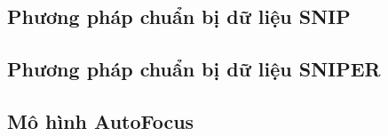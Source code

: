 {    \subsection{Phương pháp chuẩn bị dữ liệu SNIP}
    
    \snip

    \subsection{Phương pháp chuẩn bị dữ liệu SNIPER}
    
    \sniper

    \subsection{Mô hình AutoFocus}
    
    \autofocus
}